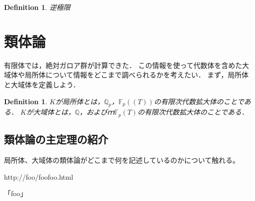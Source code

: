 \documentclass{ujarticle}
\newtheorem{dfn}[thm]{Definition}
\begin{document}
\begin{dfn}
 逆極限
\end{dfn}


\section{類体論}
\label{sub:局所体体}
有限体では，絶対ガロア群が計算できた．
この情報を使って代数体を含めた大域体や局所体について情報をどこまで調べられるかを考えたい．
まず，局所体と大域体を定義しよう．

\begin{dfn}
 $K$が局所体とは，$\mathbb{Q}_p$，$\mathbb{F}_p((T))$の有限次代数拡大体のことである．
 $K$が大域体とは，$\mathbb{Q}$，およびｍ$\mathbb{F}_p(T)$の有限次代数拡大体のことである．
\end{dfn}




\subsection{類体論の主定理の紹介}
\label{sub:類体論の主定理の紹介}
局所体、大域体の類体論がどこまで何を記述しているのかについて触れる。

\begin{thebibliography}{最大文献数}
 http://foo/foofoo.html

「foo」
\end{thebibliography}
\end{document}
